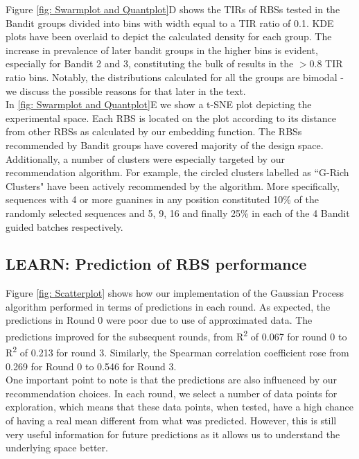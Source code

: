 \documentclass{article}
\begin{document}
Figure \ref{fig: Swarmplot and Quantplot}D shows the TIRs of RBSs tested in the Bandit groups divided into bins with width equal to a TIR ratio of 0.1.
KDE plots have been overlaid to depict the calculated density for each group.
The increase in prevalence of later bandit groups in the higher bins is evident, especially for Bandit 2 and 3, constituting the bulk of results in the $>0.8$ TIR ratio bins.
Notably, the distributions calculated for all the groups are bimodal - we discuss the possible reasons for that later in the text.\\

In \ref{fig: Swarmplot and Quantplot}E we show a t-SNE plot depicting the experimental space.
Each RBS is located on the plot according to its distance from other RBSs as calculated by our embedding function.
The RBSs recommended by Bandit groups have covered majority of the design space. 
Additionally, a number of clusters were especially targeted by our recommendation algorithm.
For example, the circled clusters labelled as ``G-Rich Clusters" have been actively recommended by the algorithm.
More specifically, sequences with 4 or more guanines in any position constituted 10\% of the randomly selected sequences and 5, 9, 16 and finally 25\% in each of the 4 Bandit guided batches respectively.

\subsection{LEARN: Prediction of RBS performance}
\label{sec:gp-results}

Figure \ref{fig: Scatterplot} shows how our implementation of the Gaussian Process algorithm performed in terms of predictions in each round. 
As expected, the predictions in Round 0 were poor due to use of approximated data. 
The predictions improved for the subsequent rounds, from R\textsuperscript{2} of 0.067 for round 0 to R\textsuperscript{2} of 0.213 for round 3.
Similarly, the Spearman correlation coefficient rose from 0.269 for Round 0 to 0.546 for Round 3.\\

One important point to note is that the predictions are also influenced by our recommendation choices. 
In each round, we select a number of data points for exploration, which means that these data points, when tested, have a high chance of having a real mean different from what was predicted.
However, this is still very useful information for future predictions as it allows us to understand the underlying space better.\\
\end{document}
